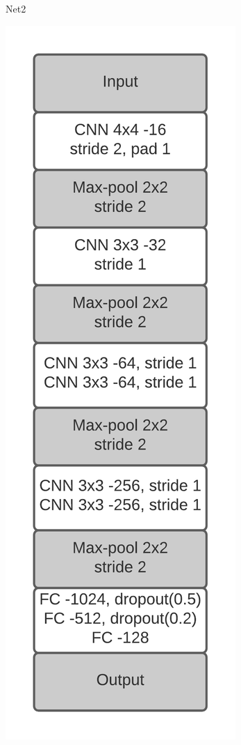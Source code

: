 \documentclass{article}
\begin{document}
\begin{figure}[h!]
\begin{subfigure}[t]{.23\textwidth}
	  \caption{Net2}
	\end{subfigure}
	\begin{subfigure}[t]{.23\textwidth}
	\centering
	\includegraphics[scale=0.66]{../code/images/Net3_layers.png}

\end{subfigure}
\end{figure}
\end{document}
